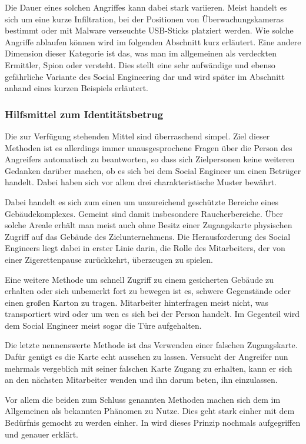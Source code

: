 Die Dauer eines solchen Angriffes kann dabei stark variieren. Meist handelt es sich um eine kurze Infiltration, bei der Positionen von Überwachungskameras bestimmt oder mit Malware verseuchte USB-Sticks  platziert werden. Wie solche Angriffe ablaufen können wird im folgenden Abschnitt kurz erläutert.
Eine andere Dimension dieser Kategorie ist das, was man im allgemeinen als verdeckten Ermittler, Spion oder  versteht. Dies stellt eine sehr aufwändige und ebenso gefährliche Variante des Social Engineering dar und wird später im Abschnitt  anhand eines kurzen Beispiels erläutert. \cite{hadnagy}\cite{hacking-the-human}

\subsubsection*{Hilfsmittel zum Identitätsbetrug}
Die zur Verfügung stehenden Mittel sind überraschend simpel. Ziel dieser Methoden ist es allerdings immer unausgesprochene Fragen über die Person des Angreifers automatisch zu beantworten, so dass sich Zielpersonen keine weiteren Gedanken darüber machen, ob es sich bei dem Social Engineer um einen Betrüger handelt. Dabei haben sich vor allem drei charakteristische Muster bewährt.

Dabei handelt es sich zum einen um unzureichend geschützte Bereiche eines Gebäudekomplexes. Gemeint sind damit insbesondere Raucherbereiche. Über solche Areale erhält man meist auch ohne Besitz einer Zugangskarte physischen Zugriff auf das Gebäude des Zielunternehmens.
Die Herausforderung des Social Engineers liegt dabei in erster Linie darin, die Rolle des Mitarbeiters, der von einer Zigerettenpause zurückkehrt, überzeugen zu spielen.

Eine weitere Methode um schnell Zugriff zu einem gesicherten Gebäude zu erhalten oder sich unbemerkt fort zu bewegen ist es, schwere Gegenstände oder einen großen Karton zu tragen. Mitarbeiter hinterfragen meist nicht, was transportiert wird oder um wen es sich bei der Person handelt. Im Gegenteil wird dem Social Engineer meist sogar die Türe aufgehalten.

Die letzte nennenswerte Methode ist das Verwenden einer falschen Zugangskarte. Dafür genügt es die Karte echt aussehen zu lassen. Versucht der Angreifer nun mehrmals vergeblich mit seiner falschen Karte Zugang zu erhalten, kann er sich an den nächsten Mitarbeiter wenden und ihn darum beten, ihn einzulassen.
\cite{hadnagy}

Vor allem die beiden zum Schluss genannten Methoden machen sich dem im Allgemeinen als  bekannten Phänomen zu Nutze. Dies geht stark einher mit dem Bedürfnis gemocht zu werden einher. In  wird dieses Prinzip nochmals aufgegriffen und genauer erklärt.

